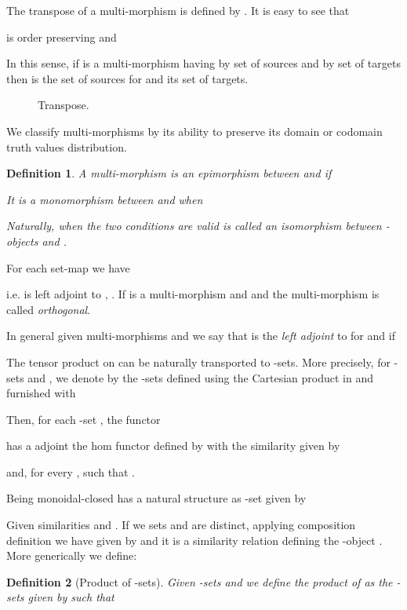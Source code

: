 \documentclass[oribibl]{llncs}
\newtheorem{defn}{Definition}
\begin{document}
The transpose  of a multi-morphism  is defined by . It is easy to see that

is order preserving and

In this sense, if  is a multi-morphism having by set of sources  and by set of targets  then  is the set of sources for  and  its set of targets.
\begin{figure}[h]

\caption{Transpose.}\label{multimorphism:transpose}
\end{figure}

We classify multi-morphisms by its ability to preserve its domain or codomain truth values distribution.

\begin{defn}\label{def:isomorphism}
A multi-morphism  is an \emph{epimorphism} between  and  if

It is a \emph{monomorphism} between  and  when

Naturally, when the two conditions are valid  is called an \emph{isomorphism} between -objects  and .
\end{defn}

For each set-map  we have

i.e.  is left adjoint to , . If  is a multi-morphism and  and  the multi-morphism  is called \emph{orthogonal}.

In general given multi-morphisms
 and  we say that  is the \emph{left adjoint} to  for  and  if


The tensor product on  can be naturally transported to -sets. More precisely, for -sets  and , we denote by  the -sets defined using the Cartesian product  in  and furnished with

Then, for each -set , the functor

has a adjoint the hom functor  defined by   with the similarity given by

and, for every ,
 such that .

Being monoidal-closed  has a natural structure as -set given by


Given similarities   and
. If we sets  and  are distinct,  applying composition definition we have   given by  and it is a similarity relation defining the -object  . More generically we define:

\begin{defn}[Product of -sets]\label{ProdSimil}
Given -sets  and  we define the product of  as the -sets  given by
 such that

\end{defn}
\end{document}
